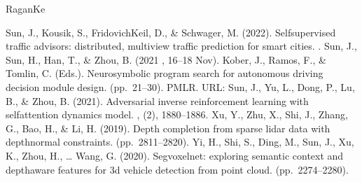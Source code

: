 \documentclass[letterpaper,10pt,english]{sphinxmanual}
\begin{document}
\begin{sphinxthebibliography}{Ragan\sphinxhyphen{}Ke}
\begin{footnote}[105]
%
\end{footnote}
\sphinxAtStartPar
Sun, J., Kousik, S., Fridovich\sphinxhyphen{}Keil, D., \& Schwager, M. (2022). Self\sphinxhyphen{}supervised traffic advisors: distributed, multi\sphinxhyphen{}view traffic prediction for smart cities. .
\sphinxAtStartPar
Sun, J., Sun, H., Han, T., \& Zhou, B. (2021 , 16–18 Nov). Kober, J., Ramos, F., \& Tomlin, C. (Eds.). Neuro\sphinxhyphen{}symbolic program search for autonomous driving decision module design.  (pp. 21–30). PMLR. URL: 
\sphinxAtStartPar
Sun, J., Yu, L., Dong, P., Lu, B., \& Zhou, B. (2021). Adversarial inverse reinforcement learning with self\sphinxhyphen{}attention dynamics model. , (2), 1880–1886.
\sphinxAtStartPar
Xu, Y., Zhu, X., Shi, J., Zhang, G., Bao, H., \& Li, H. (2019). Depth completion from sparse lidar data with depth\sphinxhyphen{}normal constraints.  (pp. 2811–2820).
\sphinxAtStartPar
Yi, H., Shi, S., Ding, M., Sun, J., Xu, K., Zhou, H., … Wang, G. (2020). Segvoxelnet: exploring semantic context and depth\sphinxhyphen{}aware features for 3d vehicle detection from point cloud.  (pp. 2274–2280).
\end{sphinxthebibliography}



\renewcommand{\indexname}{Index}
\printindex
\end{document}
